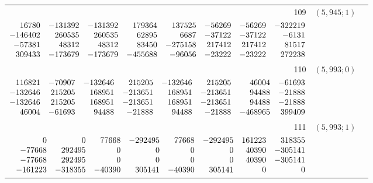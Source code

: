 \documentclass[11pt]{article}
\theoremstyle{remark}
\numberwithin{equation}{section}
\begin{document}
\begin{longtable}{rcl}
109 & $(5,945;1)$ & \begin{tabular}[t]{@{}l@{}}$w_i=\displaystyle \frac{60127745932404464559}{128568831263000003414080000000000000000}$\\[3pt]{\scriptsize$\begin{array}{@{}rrrrrrrr@{}}16780 & -131392 & -131392 & 179364 & 137525 & -56269 & -56269 & -322219\\-146402 & 260535 & 260535 & 62895 & 6687 & -37122 & -37122 & -6131\\-57381 & 48312 & 48312 & 83450 & -275158 & 217412 & 217412 & 81517\\309433 & -173679 & -173679 & -455688 & -96056 & -23222 & -23222 & 272238\end{array}$}\end{tabular}\\[8pt]
110 & $(5,993;0)$ & \begin{tabular}[t]{@{}l@{}}$w_i=\displaystyle \frac{8918917090767866327}{18100344064088401856000000000000000000}$\\[3pt]{\scriptsize$\begin{array}{@{}rrrrrrrr@{}}116821 & -70907 & -132646 & 215205 & -132646 & 215205 & 46004 & -61693\\-132646 & 215205 & 168951 & -213651 & 168951 & -213651 & 94488 & -21888\\-132646 & 215205 & 168951 & -213651 & 168951 & -213651 & 94488 & -21888\\46004 & -61693 & 94488 & -21888 & 94488 & -21888 & -468965 & 399409\end{array}$}\end{tabular}\\[8pt]
111 & $(5,993;1)$ & \begin{tabular}[t]{@{}l@{}}$w_i=\displaystyle \frac{1971639743210093}{1051311333794595120000000000000000}$\\[3pt]{\scriptsize$\begin{array}{@{}rrrrrrrr@{}}0 & 0 & 77668 & -292495 & 77668 & -292495 & 161223 & 318355\\-77668 & 292495 & 0 & 0 & 0 & 0 & 40390 & -305141\\-77668 & 292495 & 0 & 0 & 0 & 0 & 40390 & -305141\\-161223 & -318355 & -40390 & 305141 & -40390 & 305141 & 0 & 0\end{array}$}\end{tabular}\\[8pt]

\end{longtable}
\end{document}
